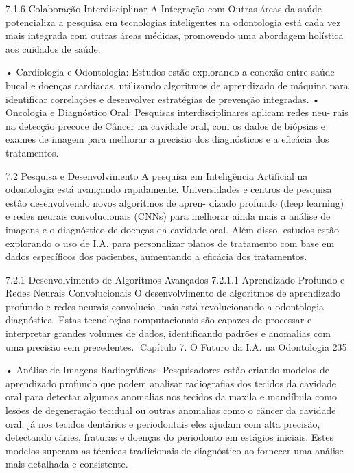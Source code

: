 7.1.6     Colaboração Interdisciplinar
A Integração com Outras áreas da saúde potencializa a pesquisa em tecnologias
inteligentes na odontologia está cada vez mais integrada com outras áreas médicas,
promovendo uma abordagem holística aos cuidados de saúde.

    • Cardiologia e Odontologia: Estudos estão explorando a conexão entre saúde
      bucal e doenças cardíacas, utilizando algoritmos de aprendizado de máquina
      para identificar correlações e desenvolver estratégias de prevenção integradas.
    • Oncologia e Diagnóstico Oral: Pesquisas interdisciplinares aplicam redes neu-
      rais na detecção precoce de Câncer na cavidade oral, com os dados de biópsias
      e exames de imagem para melhorar a precisão dos diagnósticos e a eficácia dos
      tratamentos.


7.2       Pesquisa e Desenvolvimento
A pesquisa em Inteligência Artificial na odontologia está avançando rapidamente.
Universidades e centros de pesquisa estão desenvolvendo novos algoritmos de apren-
dizado profundo (deep learning) e redes neurais convolucionais (CNNs) para melhorar
ainda mais a análise de imagens e o diagnóstico de doenças da cavidade oral. Além
disso, estudos estão explorando o uso de I.A. para personalizar planos de tratamento
com base em dados específicos dos pacientes, aumentando a eficácia dos tratamentos.

7.2.1     Desenvolvimento de Algoritmos Avançados
7.2.1.1   Aprendizado Profundo e Redes Neurais Convolucionais
O desenvolvimento de algoritmos de aprendizado profundo e redes neurais convolucio-
nais está revolucionando a odontologia diagnóstica. Estas tecnologias computacionais
são capazes de processar e interpretar grandes volumes de dados, identificando
padrões e anomalias com uma precisão sem precedentes.
Capítulo 7. O Futuro da I.A. na Odontologia                                       235


    • Análise de Imagens Radiográficas: Pesquisadores estão criando modelos de
      aprendizado profundo que podem analisar radiografias dos tecidos da cavidade
      oral para detectar algumas anomalias nos tecidos da maxila e mandíbula como
      lesões de degeneração tecidual ou outras anomalias como o câncer da cavidade
      oral; já nos tecidos dentários e periodontais eles ajudam com alta precisão,
      detectando cáries, fraturas e doenças do periodonto em estágios iniciais. Estes
      modelos superam as técnicas tradicionais de diagnóstico ao fornecer uma análise
      mais detalhada e consistente.

